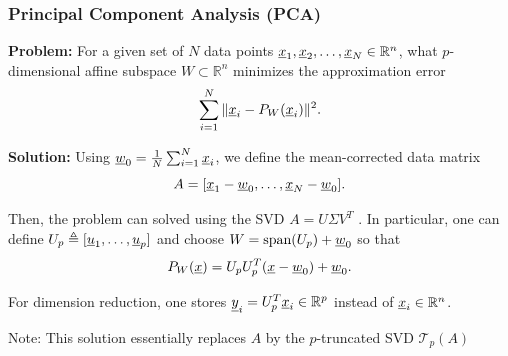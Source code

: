 \documentclass[10pt,english,aspectratio=169]{beamer}
\begin{document}
\begin{frame} \frametitle{Principal Component Analysis (PCA)}

\textbf{Problem:} For a given set of $N$ data points $\underline x_{1},\underline x_{2},\ldots,\underline x_{N}\in\mathbb{R}^{n}$, what $p$-dimensional affine subspace $W\subset\mathbb{R}^{n}$ minimizes the approximation error \vspace{-1.5mm}
\[
\sum_{i=1}^{N}\|\underline x_{i}-P_{W}(\underline x_{i})\|^{2}.
\]

\vspace{-1.5mm}

\textbf{Solution:} Using $\underline w_{0}=\frac{1}{N}\sum_{i=1}^{N}\underline x_{i}$, we define the mean-corrected data matrix \vspace{-1.5mm}
\[ A=[\underline x_{1}-\underline w_{0},\ldots,\underline x_{N}-\underline w_{0}]. \]

\vspace{-1mm}

Then, the problem can solved using the SVD $A=U\Sigma V^{T}$ .
In particular, one can define $U_{p}\triangleq[\underline u_{1},\ldots,\underline u_{p}]$ and choose $W = \textrm{span}(U_p) + \underline{w}_0$ so that \vspace{-1.5mm}
\[ P_{W}(\underline x)=U_{p}U_{p}^{T}(\underline x-\underline w_{0})+\underline w_{0} . \]

\vspace{-1mm}

For dimension reduction, one stores $\underline y_{i}=U_{p}^{T}\underline x_{i}\in\mathbb{R}^{p}$ instead of $\underline x_{i}\in\mathbb{R}^{n}$.

\vspace{4mm}

Note: This solution essentially replaces $A$ by the $p$-truncated SVD $\mathcal{T}_p (A)$

%
 


\end{frame}
\end{document}
